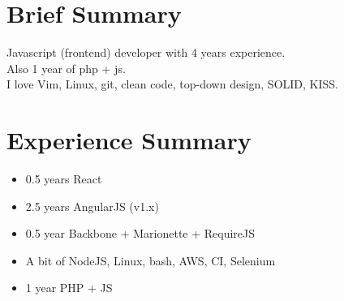 \documentclass[a4paper, 14pt]{article}
\begin{document}
\begin{center}
	\textsc{\Huge{}}
\end{center}


\section{Brief Summary}
    Javascript (frontend) developer with 4 years experience.  \\
    Also 1 year of php + js. \\
    I love Vim, Linux, git, clean code, top-down design, SOLID, KISS.

\section{Experience Summary}
  \begin{itemize}
    \item 0.5 years React \\
    \item 2.5 years AngularJS (v1.x) \\ 
    \item 0.5 year Backbone + Marionette + RequireJS \\ 
    \item A bit of NodeJS, Linux, bash, AWS, CI, Selenium \\
    \item 1 year PHP + JS
  \end{itemize}
\end{document}
